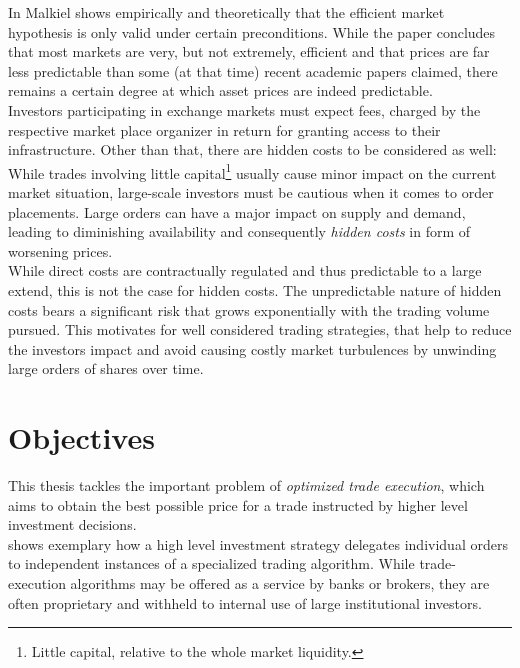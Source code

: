 In \Cite{TheEfficentMarketHypothesisAndItsCritics} Malkiel shows empirically and theoretically that the efficient market hypothesis is only valid under certain preconditions. While the paper concludes that most markets are very, but not extremely, efficient and that prices are far less predictable than some (at that time) recent academic papers claimed, there remains a certain degree at which asset prices are indeed predictable.\\

Investors participating in exchange markets must expect fees, charged by the respective market place organizer in return for granting access to their infrastructure. Other than that, there are hidden costs to be considered as well: While trades involving little capital\footnote{Little capital, relative to the whole market liquidity.} usually cause minor impact on the current market situation, large-scale investors must be cautious when it comes to order placements. Large orders can have a major impact on supply and demand, leading to diminishing availability and consequently \emph{hidden costs} in form of worsening prices.\\

While direct costs are contractually regulated and thus predictable to a large extend, this is not the case for hidden costs. The unpredictable nature of hidden costs bears a significant risk that grows exponentially with the trading volume pursued. This motivates for well considered trading strategies, that help to reduce the investors impact and avoid causing costly market turbulences by unwinding large orders of shares over time.



\section{Objectives}
\label{chap:objectives}
This thesis tackles the important problem of \emph{optimized trade execution}, which aims to obtain the best possible price for a trade instructed by higher level investment decisions.\\

 shows exemplary how a high level investment strategy delegates individual orders to independent instances of a specialized trading algorithm. While trade-execution algorithms may be offered as a service by banks or brokers, they are often proprietary and withheld to internal use of large institutional investors.\\




